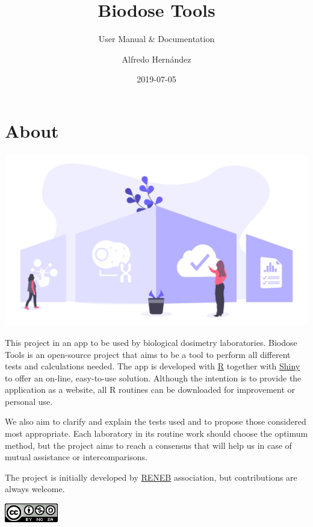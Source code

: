 \documentclass[]{scrartcl}
\title{Biodose Tools}
\subtitle{User Manual \& Documentation}
\author{Alfredo Hernández}
\date{2019-07-05}
\begin{document}

\maketitle

{
\setcounter{tocdepth}{2}
\tableofcontents
}
\hypertarget{about}{%
\section*{About}\label{about}}

\includegraphics{images/home.pdf}

This project in an app to be used by biological dosimetry laboratories. Biodose Tools is an open-source project that aims to be a tool to perform all different tests and calculations needed. The app is developed with \href{https://www.r-project.org/about.html}{R} \citep{R-base} together with \href{https://shiny.rstudio.com}{Shiny} \citep{R-shiny} to offer an on-line, easy-to-use solution. Although the intention is to provide the application as a website, all R routines can be downloaded for improvement or personal use.

We also aim to clarify and explain the tests used and to propose those considered most appropriate. Each laboratory in its routine work should choose the optimum method, but the project aims to reach a consensus that will help us in case of mutual assistance or intercomparisons.

The project is initially developed by \href{http://www.reneb.net}{RENEB} association, but contributions are always welcome.

\begin{center}\includegraphics[width=0.92in]{images/by-nc-sa} \end{center}
\end{document}
